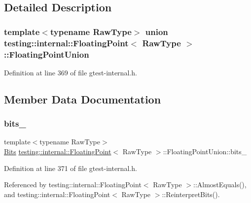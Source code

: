 \subsection{Detailed Description}
\subsubsection*{template$<$typename Raw\+Type$>$\newline
union testing\+::internal\+::\+Floating\+Point$<$ Raw\+Type $>$\+::\+Floating\+Point\+Union}



Definition at line 369 of file gtest-\/internal.\+h.



\subsection{Member Data Documentation}
\mbox{\label{uniontesting_1_1internal_1_1FloatingPoint_1_1FloatingPointUnion_aedb69e386f5d624a016f7a781302a2bf}} 
\subsubsection{\texorpdfstring{bits\+\_\+}{bits\_}}
{\footnotesize\ttfamily template$<$typename Raw\+Type$>$ \\
\hyperlink{classtesting_1_1internal_1_1FloatingPoint_abf228bf6cd48f12c8b44c85b4971a731}{Bits} \hyperlink{classtesting_1_1internal_1_1FloatingPoint}{testing\+::internal\+::\+Floating\+Point}$<$ Raw\+Type $>$\+::Floating\+Point\+Union\+::bits\+\_\+}



Definition at line 371 of file gtest-\/internal.\+h.



Referenced by testing\+::internal\+::\+Floating\+Point$<$ Raw\+Type $>$\+::\+Almost\+Equals(), and testing\+::internal\+::\+Floating\+Point$<$ Raw\+Type $>$\+::\+Reinterpret\+Bits().

\mbox{\label{uniontesting_1_1internal_1_1FloatingPoint_1_1FloatingPointUnion_a4ee324889f70577721393e8e1920e4c6}} 
